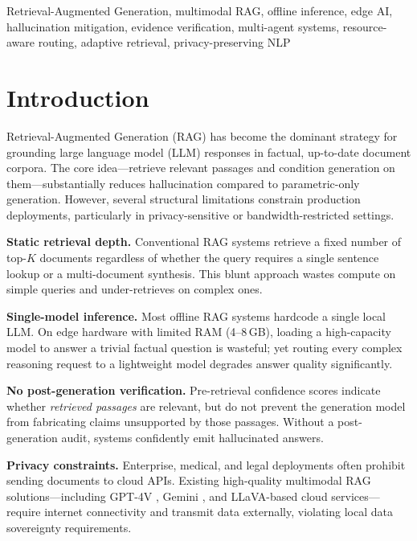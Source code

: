 \documentclass[conference]{IEEEtran}
\begin{document}
\begin{IEEEkeywords}
Retrieval-Augmented Generation, multimodal RAG, offline inference, edge AI,
hallucination mitigation, evidence verification, multi-agent systems,
resource-aware routing, adaptive retrieval, privacy-preserving NLP
\end{IEEEkeywords}

\section{Introduction}\label{sec:intro}

Retrieval-Augmented Generation (RAG) \cite{lewis2020rag} has become the
dominant strategy for grounding large language model (LLM) responses in
factual, up-to-date document corpora. The core idea—retrieve relevant
passages and condition generation on them—substantially reduces hallucination
compared to parametric-only generation. However, several structural
limitations constrain production deployments, particularly in
privacy-sensitive or bandwidth-restricted settings.

\textbf{Static retrieval depth.} Conventional RAG systems retrieve a fixed
number of top-$K$ documents regardless of whether the query requires a
single sentence lookup or a multi-document synthesis. This blunt approach
wastes compute on simple queries and under-retrieves on complex ones.

\textbf{Single-model inference.} Most offline RAG systems hardcode a single
local LLM. On edge hardware with limited RAM (4–8\,GB), loading a
high-capacity model to answer a trivial factual question is wasteful; yet
routing every complex reasoning request to a lightweight model degrades
answer quality significantly.

\textbf{No post-generation verification.} Pre-retrieval confidence scores
indicate whether \textit{retrieved passages} are relevant, but do not prevent
the generation model from fabricating claims unsupported by those passages.
Without a post-generation audit, systems confidently emit hallucinated
answers.

\textbf{Privacy constraints.} Enterprise, medical, and legal deployments
often prohibit sending documents to cloud APIs. Existing high-quality
multimodal RAG solutions—including GPT-4V \cite{openai2023gpt4}, Gemini
\cite{google2023gemini}, and LLaVA-based cloud services—require internet
connectivity and transmit data externally, violating local data sovereignty
requirements.
\end{document}
